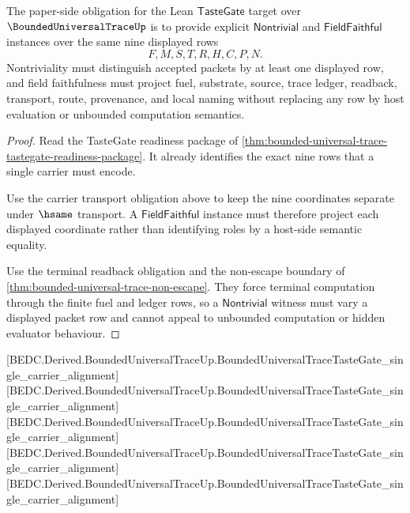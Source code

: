 \begin{theorem}
\label{thm:bounded-universal-trace-nontrivial-fieldfaithful-obligation}
The paper-side obligation for the Lean $\mathsf{TasteGate}$ target over $\BoundedUniversalTraceUp$ is to provide explicit $\mathsf{Nontrivial}$ and $\mathsf{FieldFaithful}$ instances over the same nine displayed rows
$$
F,M,S,T,R,H,C,P,N.
$$
Nontriviality must distinguish accepted packets by at least one displayed row, and field faithfulness must project fuel, substrate, source, trace ledger, readback, transport, route, provenance, and local naming without replacing any row by host evaluation or unbounded computation semantics.
\end{theorem}
\begin{proof}
Read the TasteGate readiness package of \autoref{thm:bounded-universal-trace-tastegate-readiness-package}. It already identifies the exact nine rows that a single carrier must encode.

Use the carrier transport obligation above to keep the nine coordinates separate under $\hsame$ transport. A $\mathsf{FieldFaithful}$ instance must therefore project each displayed coordinate rather than identifying roles by a host-side semantic equality.

Use the terminal readback obligation and the non-escape boundary of \autoref{thm:bounded-universal-trace-non-escape}. They force terminal computation through the finite fuel and ledger rows, so a $\mathsf{Nontrivial}$ witness must vary a displayed packet row and cannot appeal to unbounded computation or hidden evaluator behaviour.
\end{proof}

[BEDC.Derived.BoundedUniversalTraceUp.BoundedUniversalTraceTasteGate\_single\_carrier\_alignment]
[BEDC.Derived.BoundedUniversalTraceUp.BoundedUniversalTraceTasteGate\_single\_carrier\_alignment]
[BEDC.Derived.BoundedUniversalTraceUp.BoundedUniversalTraceTasteGate\_single\_carrier\_alignment]
[BEDC.Derived.BoundedUniversalTraceUp.BoundedUniversalTraceTasteGate\_single\_carrier\_alignment]
[BEDC.Derived.BoundedUniversalTraceUp.BoundedUniversalTraceTasteGate\_single\_carrier\_alignment]

